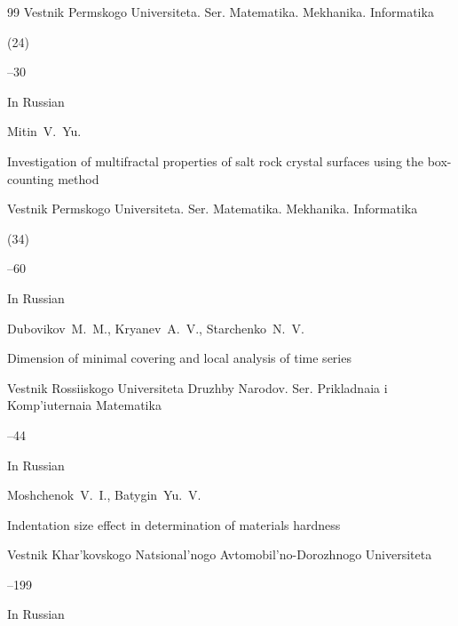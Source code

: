 \begin{thebibliography}{99}
\jour Vestnik Permskogo Universiteta. Ser. Mate\-matika. Mekhanika. Informatika


(24)

--30

\lang In Russian









\by Mitin~V.~Yu.

\paper Investigation of multifractal properties of salt rock crystal surfaces using the box-counting method

\jour Vestnik Permskogo Universiteta. Ser. Matematika. Mekhanika. Informatika


(34)

--60

\lang In Russian














\by Dubovikov~M.~M., Kryanev~A.~V., Starchenko~N.~V.

\paper Dimension of minimal covering and local analysis of time series

\jour Vestnik Rossiiskogo Universiteta Druzhby Narodov. Ser. Prikladnaia i Komp'iuternaia Matematika




--44

\lang In Russian








\by Moshchenok~V.~I., Batygin~Yu.~V.

\paper Indentation size effect in determination of materials hardness

\jour Vestnik Khar'kovskogo Natsional'nogo Avtomobil'no-Dorozhnogo Universiteta



--199

\lang In Russian





\end{thebibliography}



%

%